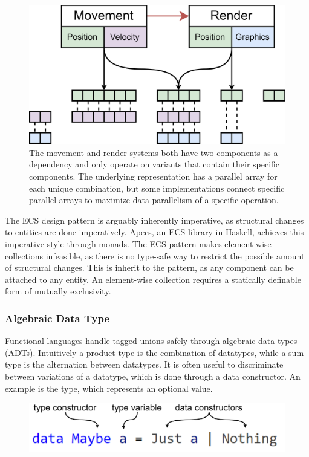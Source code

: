 \documentclass{article}
\newcommand{\type}[1]{\smash{\colorbox{codegray}{\texttt{#1}}}}
\begin{document}
\begin{figure}[ht]
    \centering
    \includegraphics[scale=0.10]{ECSexample.png}
    \caption
    { 
        The movement and render systems both have two components as a dependency and only operate on variants that contain their specific components.
        The underlying representation has a parallel array for each unique combination, but some implementations connect specific parallel arrays to maximize data-parallelism of a specific operation. 
    }
\end{figure}

The ECS design pattern is arguably inherently imperative, as structural changes to entities are done imperatively.
Apecs, an ECS library in Haskell, achieves this imperative style through monads\cite{ecs-apecs}.
The ECS pattern makes element-wise collections infeasible, as there is no type-safe way to restrict the possible amount of structural changes.
This is inherit to the pattern, as any component can be attached to any entity.
An element-wise collection requires a statically definable form of mutually exclusivity.

\newpage

\subsubsection{Algebraic Data Type}

Functional languages handle tagged unions safely through algebraic data types (ADTs).
Intuitively a product type is the combination of datatypes, while a sum type is the alternation between datatypes.
It is often useful to discriminate between variations of a datatype, which is done through a data constructor.
An example is the \type{Maybe a} type, which represents an optional value. 

\begin{figure}[ht]
    \hspace{1em}
    \includegraphics[scale=0.05]{InterfaceCode1Annotated.png}
\end{figure}
\end{document}
